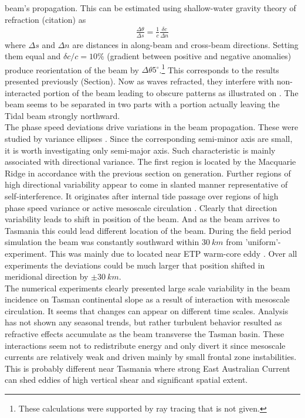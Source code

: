 \documentclass[12pt]{article}
\begin{document}
beam's propagation. This can be estimated using shallow-water gravity theory of refraction 
(citation) as
\begin{align}
\frac{\Delta \theta}{\Delta s} = \frac{1}{c} \frac{\delta c}{\Delta n}
\end{align}
where $\Delta s$ and $\Delta n$ are distances in along-beam and cross-beam directions. Setting them 
equal and $\delta c/c = 10\%$ (gradient between positive and negative anomalies) produce 
reorientation of the beam by $\Delta \theta 5^{\circ}$.\footnote{ These calculations were supported 
by ray 
tracing that is not given.} This corresponds to the results presented previously (Section). Now as 
waves refracted, they interfere with non-interacted portion of the beam leading to 
obscure patterns as illustrated on . The beam seems to be separated in 
two parts with a portion actually leaving the Tidal beam strongly northward.\\
The phase speed deviations drive variations in the beam propagation. These were studied by variance 
ellipses . Since the corresponding semi-minor axis are small, it is 
worth investigating only semi-major axis. Such characteristic is mainly associated with directional 
variance. The first region is located by the Macquarie Ridge in accordance with the previous 
section on generation. Further regions of high directional variability appear to come in slanted 
manner representative of self-interference. It originates after internal tide passage over regions 
of high phase speed variance or active mesoscale circulation . 
Clearly that direction variability leads to shift in position of the beam. And as the beam arrives 
to Tasmania this could lead different location of the beam. During the field period simulation the 
beam was constantly southward within $30~km$ from 'uniform'-experiment. This was mainly due to 
located near ETP warm-core eddy . Over all experiments the 
deviations could be much larger that position shifted in meridional direction by $\pm 30~km$.\\
The numerical experiments clearly presented large scale variability in the beam incidence on Tasman 
continental slope as a result of interaction with mesoscale circulation. It seems that changes can 
appear on different time scales. Analysis has not shown any seasonal trends, but rather turbulent 
behavior resulted as refractive effects accumulate as the beam transverse the Tasman basin. These 
interactions seem not to redistribute energy and only divert it since mesoscale currents are 
relatively weak and driven mainly by small frontal zone instabilities. This is probably different 
near Tasmania where strong East Australian Current can shed eddies of high vertical shear and 
significant spatial extent.
\end{document}
